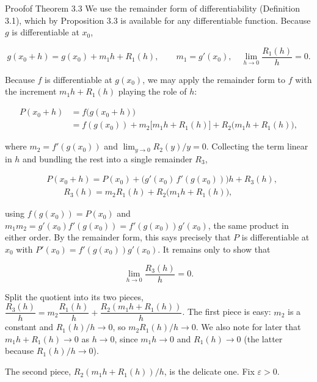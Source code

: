 \documentclass[a4paper,12pt,oneside]{memoir}
\begin{document}
\begin{envproof}{Proof}{}{of Theorem 3.3}
We use the remainder form of differentiability (Definition 3.1), which by Proposition 3.3 is available for any differentiable function. Because \(g\) is differentiable at \(x_{0}\),

\[ g(x_{0} + h) = g(x_{0}) + m_{1} h + R_{1}(h), \qquad m_{1} = g'(x_{0}), \quad \lim_{h \to 0}\frac{R_{1}(h)}{h} = 0. \]

Because \(f\) is differentiable at \(g(x_{0})\), we may apply the remainder form to \(f\) with the increment \(m_{1} h + R_{1}(h)\) playing the role of \(h\):

\[ \begin{aligned}
        P(x_{0}+h)
          &= f\bigl(g(x_{0}+h)\bigr) \\[2pt]
          &= f(g(x_{0})) + m_{2}\bigl[m_{1} h + R_{1}(h)\bigr] + R_{2}\bigl(m_{1} h + R_{1}(h)\bigr),
      \end{aligned} \]

where \(m_{2} = f'(g(x_{0}))\) and \(\lim_{y \to 0} R_{2}(y)/y = 0\). Collecting the term linear in \(h\) and bundling the rest into a single remainder \(R_{3}\),

\[ \begin{aligned}
        &P(x_{0}+h) = P(x_{0}) + \bigl(g'(x_{0})\,f'(g(x_{0}))\bigr) h + R_{3}(h), \\[2pt]
        &\qquad R_{3}(h) = m_{2} R_{1}(h) + R_{2}\bigl(m_{1} h + R_{1}(h)\bigr),
      \end{aligned} \]

using \(f(g(x_{0})) = P(x_{0})\) and \(m_{1} m_{2} = g'(x_{0})f'(g(x_{0})) = f'(g(x_{0}))g'(x_{0})\), the same product in either order. By the remainder form, this says precisely that \(P\) is differentiable at \(x_{0}\) with \(P'(x_{0}) = f'(g(x_{0}))g'(x_{0})\). It remains only to show that

\[ \lim_{h \to 0}\frac{R_{3}(h)}{h} = 0. \]

Split the quotient into its two pieces, \(\dfrac{R_{3}(h)}{h} = m_{2}\dfrac{R_{1}(h)}{h} + \dfrac{R_{2}(m_{1} h + R_{1}(h))}{h}\). The first piece is easy: \(m_{2}\) is a constant and \(R_{1}(h)/h \to 0\), so \(m_{2} R_{1}(h)/h \to 0\). We also note for later that \(m_{1} h + R_{1}(h) \to 0\) as \(h \to 0\), since \(m_{1} h \to 0\) and \(R_{1}(h) \to 0\) (the latter because \(R_{1}(h)/h \to 0\)).

The second piece, \(R_{2}(m_{1} h + R_{1}(h))/h\), is the delicate one. Fix \(\varepsilon > 0\).


\end{envproof}
\end{document}
